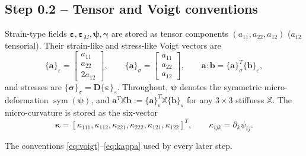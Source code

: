 \documentclass[11pt,a4paper]{article}
\newcommand{\Dm}{\mathbf{D}}                    %
\newcommand{\eps}{\bm{\varepsilon}}
\newcommand{\epsM}{\bm{\varepsilon}_{M}}
\newcommand{\bpsi}{\bm{\psi}}
\newcommand{\bgam}{\bm{\gamma}}
\newcommand{\bkap}{\bm{\kappa}}
\newcommand{\bsig}{\bm{\sigma}}
\newcommand{\sym}{\operatorname{sym}}
\newcommand{\ve}[1]{\{#1\}_{\varepsilon}}      %
\newcommand{\vs}[1]{\{#1\}_{\sigma}}           %
\theoremstyle{plain}
\theoremstyle{remark}
\begin{document}
\subsection*{Step 0.2 -- Tensor and Voigt conventions}
Strain-type fields $\eps,\epsM,\bpsi,\bgam$ are stored as tensor components
$(a_{11},a_{22},a_{12})$ ($a_{12}$ tensorial). Their strain-like and stress-like Voigt vectors are
\begin{equation}
  \ve{\bm a}=\begin{bmatrix}a_{11}\\a_{22}\\2a_{12}\end{bmatrix},\qquad
  \vs{\bm a}=\begin{bmatrix}a_{11}\\a_{22}\\a_{12}\end{bmatrix},\qquad
  \bm a:\bm b=\vs{\bm a}^T\ve{\bm b},
  \label{eq:voigt}
\end{equation}
and stresses are $\vs{\bsig}=\Dm\ve{\eps}$. Throughout, $\bpsi$ denotes the symmetric
micro-deformation $\sym(\bpsi)$, and $\bm a^T\mathbb{X}\bm b:=\ve{\bm a}^T\mathbb{X}\ve{\bm b}$ for
any $3\times3$ stiffness $\mathbb{X}$. The micro-curvature is stored as the six-vector
\begin{equation}
  \bkap=[\kappa_{111},\kappa_{112},\kappa_{221},\kappa_{222},\kappa_{121},\kappa_{122}]^T,
  \qquad \kappa_{ijk}=\partial_k\psi_{ij}.
  \label{eq:kappa}
\end{equation}
\begin{delivers}
The conventions \eqref{eq:voigt}--\eqref{eq:kappa} used by every later step.
\end{delivers}
\end{document}
